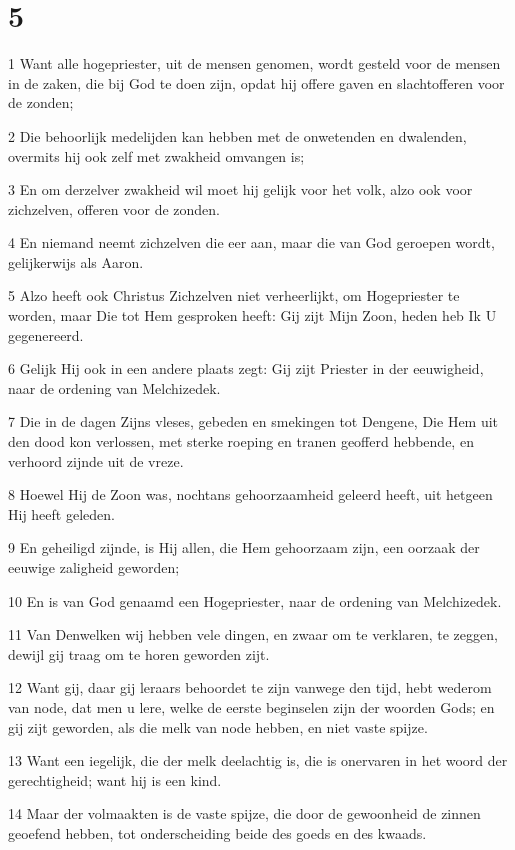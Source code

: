 \chapter{5}

\par 1 Want alle hogepriester, uit de mensen genomen, wordt gesteld voor de mensen in de zaken, die bij God te doen zijn, opdat hij offere gaven en slachtofferen voor de zonden;
\par 2 Die behoorlijk medelijden kan hebben met de onwetenden en dwalenden, overmits hij ook zelf met zwakheid omvangen is;
\par 3 En om derzelver zwakheid wil moet hij gelijk voor het volk, alzo ook voor zichzelven, offeren voor de zonden.
\par 4 En niemand neemt zichzelven die eer aan, maar die van God geroepen wordt, gelijkerwijs als Aaron.
\par 5 Alzo heeft ook Christus Zichzelven niet verheerlijkt, om Hogepriester te worden, maar Die tot Hem gesproken heeft: Gij zijt Mijn Zoon, heden heb Ik U gegenereerd.
\par 6 Gelijk Hij ook in een andere plaats zegt: Gij zijt Priester in der eeuwigheid, naar de ordening van Melchizedek.
\par 7 Die in de dagen Zijns vleses, gebeden en smekingen tot Dengene, Die Hem uit den dood kon verlossen, met sterke roeping en tranen geofferd hebbende, en verhoord zijnde uit de vreze.
\par 8 Hoewel Hij de Zoon was, nochtans gehoorzaamheid geleerd heeft, uit hetgeen Hij heeft geleden.
\par 9 En geheiligd zijnde, is Hij allen, die Hem gehoorzaam zijn, een oorzaak der eeuwige zaligheid geworden;
\par 10 En is van God genaamd een Hogepriester, naar de ordening van Melchizedek.
\par 11 Van Denwelken wij hebben vele dingen, en zwaar om te verklaren, te zeggen, dewijl gij traag om te horen geworden zijt.
\par 12 Want gij, daar gij leraars behoordet te zijn vanwege den tijd, hebt wederom van node, dat men u lere, welke de eerste beginselen zijn der woorden Gods; en gij zijt geworden, als die melk van node hebben, en niet vaste spijze.
\par 13 Want een iegelijk, die der melk deelachtig is, die is onervaren in het woord der gerechtigheid; want hij is een kind.
\par 14 Maar der volmaakten is de vaste spijze, die door de gewoonheid de zinnen geoefend hebben, tot onderscheiding beide des goeds en des kwaads.

